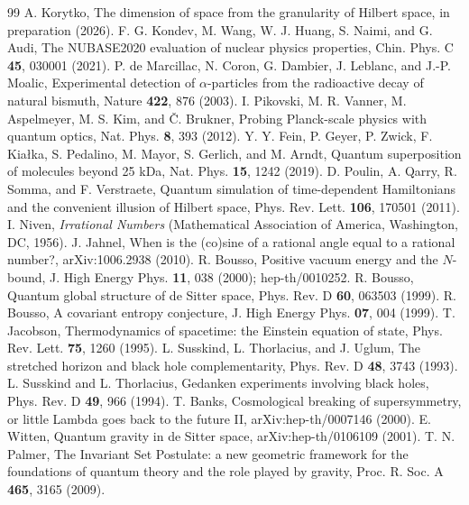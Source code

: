 \documentclass[aps,prd,twocolumn,superscriptaddress,nofootinbib]{revtex4-2}
\begin{document}
\begin{thebibliography}{99}
 A. Korytko, The dimension of space from the granularity of Hilbert space, in preparation (2026).
 F. G. Kondev, M. Wang, W. J. Huang, S. Naimi, and G. Audi, The NUBASE2020 evaluation of nuclear physics properties, Chin. Phys. C \textbf{45}, 030001 (2021).
 P. de Marcillac, N. Coron, G. Dambier, J. Leblanc, and J.-P. Moalic, Experimental detection of $\alpha$-particles from the radioactive decay of natural bismuth, Nature \textbf{422}, 876 (2003).
 I. Pikovski, M. R. Vanner, M. Aspelmeyer, M. S. Kim, and \v{C}. Brukner, Probing Planck-scale physics with quantum optics, Nat. Phys. \textbf{8}, 393 (2012).
 Y. Y. Fein, P. Geyer, P. Zwick, F. Kia\l{}ka, S. Pedalino, M. Mayor, S. Gerlich, and M. Arndt, Quantum superposition of molecules beyond 25 kDa, Nat. Phys. \textbf{15}, 1242 (2019).
 D. Poulin, A. Qarry, R. Somma, and F. Verstraete, Quantum simulation of time-dependent Hamiltonians and the convenient illusion of Hilbert space, Phys. Rev. Lett. \textbf{106}, 170501 (2011).
 I. Niven, \emph{Irrational Numbers} (Mathematical Association of America, Washington, DC, 1956).
 J. Jahnel, When is the (co)sine of a rational angle equal to a rational number?, arXiv:1006.2938 (2010).
 R. Bousso, Positive vacuum energy and the $N$-bound, J. High Energy Phys. \textbf{11}, 038 (2000); hep-th/0010252.
 R. Bousso, Quantum global structure of de Sitter space, Phys. Rev. D \textbf{60}, 063503 (1999).
 R. Bousso, A covariant entropy conjecture, J. High Energy Phys. \textbf{07}, 004 (1999).
 T. Jacobson, Thermodynamics of spacetime: the Einstein equation of state, Phys. Rev. Lett. \textbf{75}, 1260 (1995).
 L. Susskind, L. Thorlacius, and J. Uglum, The stretched horizon and black hole complementarity, Phys. Rev. D \textbf{48}, 3743 (1993).
 L. Susskind and L. Thorlacius, Gedanken experiments involving black holes, Phys. Rev. D \textbf{49}, 966 (1994).
 T. Banks, Cosmological breaking of supersymmetry, or little Lambda goes back to the future II, arXiv:hep-th/0007146 (2000).
 E. Witten, Quantum gravity in de Sitter space, arXiv:hep-th/0106109 (2001).
 T. N. Palmer, The Invariant Set Postulate: a new geometric framework for the foundations of quantum theory and the role played by gravity, Proc. R. Soc. A \textbf{465}, 3165 (2009).

\end{thebibliography}
\end{document}
